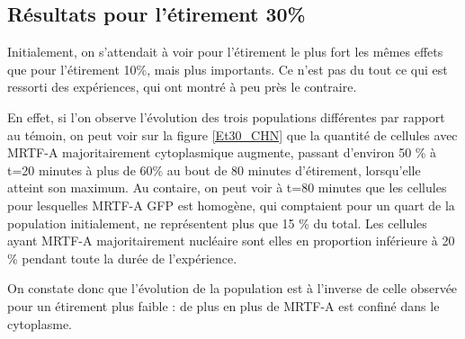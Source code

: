 \subsection{Résultats pour l'étirement 30\%}

Initialement, on s'attendait à voir pour l'étirement le plus fort les mêmes effets que pour l'étirement 10\%, mais plus importants. 
Ce n'est pas du tout ce qui est ressorti des expériences, qui ont montré à peu près le contraire. 

En effet, si l'on observe l'évolution des trois populations différentes par rapport au témoin, on peut voir sur la figure \ref{Et30_CHN} que la quantité de cellules avec MRTF-A majoritairement cytoplasmique augmente, passant d'environ 50 \% à t=20 minutes à plus de 60\% au bout de 80 minutes d'étirement, lorsqu'elle atteint son maximum. 
Au contaire, on peut voir à t=80 minutes que les cellules pour lesquelles MRTF-A GFP est homogène, qui comptaient pour un quart de la population initialement, ne représentent plus que 15 \% du total. 
Les cellules ayant MRTF-A majoritairement nucléaire sont elles en proportion inférieure à 20 \% pendant toute la durée de l'expérience. 

On constate donc que l'évolution de la population est à l'inverse de celle observée pour un étirement plus faible : de plus en plus de MRTF-A est confiné dans le cytoplasme. 

